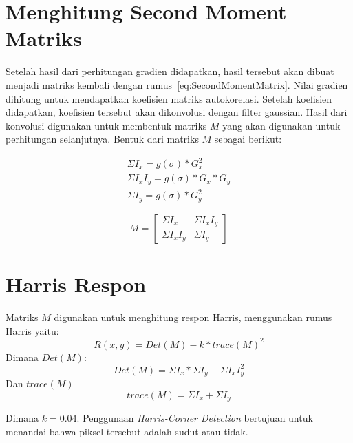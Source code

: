 \section{Menghitung Second Moment Matriks}
    Setelah hasil dari perhitungan gradien didapatkan, hasil tersebut akan dibuat menjadi matriks kembali dengan rumus~\eqref{eq:SecondMomentMatrix}. Nilai gradien dihitung untuk mendapatkan koefisien matriks autokorelasi. Setelah koefisien didapatkan, koefisien tersebut akan dikonvolusi dengan filter gaussian.
Hasil dari konvolusi digunakan untuk membentuk matriks \(M\) yang akan digunakan untuk perhitungan selanjutnya. Bentuk dari matriks \(M\) sebagai berikut:

\begin{equation*}
    \begin{aligned}
        \Sigma I_{x} = g(\sigma) * G_{x}^2 \\
        \Sigma I_{x}I_{y} = g(\sigma) * G_{x} * G_{y} \\
        \Sigma I_{y} = g(\sigma) * G_{y}^2
    \end{aligned}
\end{equation*}

\begin{equation}
    M = 
    \begin{bmatrix}
        \Sigma I_{x} & \Sigma I_{x}I_{y} \\
        \Sigma I_{x}I_{y} & \Sigma I_{y}
    \end{bmatrix} 
\end{equation}

\section{Harris Respon}
    Matriks \(M\) digunakan untuk menghitung respon Harris, menggunakan rumus Harris yaitu:
\begin{equation}
    R(x,y) = Det(M) - k * {trace(M)}^2
\end{equation}
Dimana \(Det(M)\):
\begin{equation*}
    Det(M) = \Sigma I_{x} * \Sigma I_{y} - \Sigma I_{x}I_{y}^2
\end{equation*}
Dan \(trace(M)\) 
\begin{equation*}
    trace(M) = \Sigma I_{x} + \Sigma I_{y}
\end{equation*}

    Dimana \(k = 0.04\). Penggunaan \emph{Harris-Corner Detection} bertujuan untuk menandai bahwa piksel tersebut adalah sudut atau tidak.

